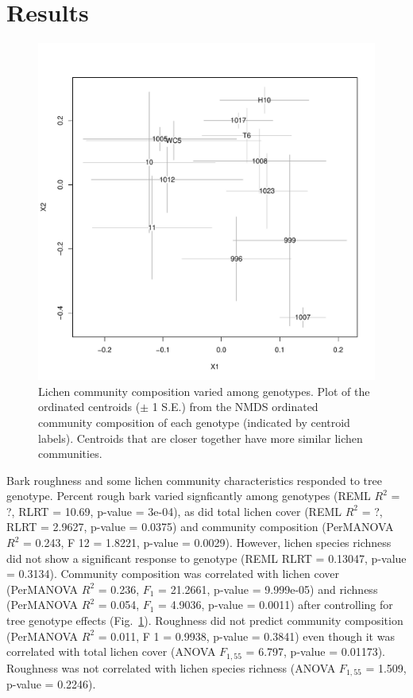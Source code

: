 \documentclass[9pt,twocolumn,twoside,lineno]{pnas-new}
\begin{document}
{\section*{Results}


\begin{figure}[ht]
\centering
\includegraphics[width=\linewidth]{com_chplot_onc.pdf}
\caption{Lichen community composition varied among genotypes. Plot of
  the ordinated centroids ($\pm$ 1 S.E.) from the NMDS ordinated
  community composition of each genotype (indicated by centroid
  labels). Centroids that are closer together have more similar lichen
  communities.}
\label{fig:com_ch_plot}
\end{figure}


Bark roughness and some lichen community characteristics responded to
tree genotype. Percent rough bark varied signficantly among genotypes
(REML $R^2$ = ?, RLRT = 10.69, p-value = 3e-04), as did total lichen
cover (REML $R^2$ = ?, RLRT = 2.9627, p-value = 0.0375) and community
composition (PerMANOVA $R^2$ = 0.243, F 12 = 1.8221, p-value =
0.0029). However, lichen species richness did not show a significant
response to genotype (REML RLRT = 0.13047, p-value =
0.3134). Community composition was correlated with lichen cover
(PerMANOVA $R^2$ = 0.236, $F_1$ = 21.2661, p-value = 9.999e-05) and
richness (PerMANOVA $R^2$ = 0.054, $F_1$ = 4.9036, p-value = 0.0011)
after controlling for tree genotype effects
(Fig.~\ref{fig:com_ch_plot}). Roughness did not predict community
composition (PerMANOVA $R^2$ = 0.011, F 1 = 0.9938, p-value = 0.3841)
even though it was correlated with total lichen cover (ANOVA
$F_{1,55}$ = 6.797, p-value = 0.01173). Roughness was not correlated
with lichen species richness (ANOVA $F_{1, 55}$ = 1.509, p-value =
0.2246).


}
\end{document}
